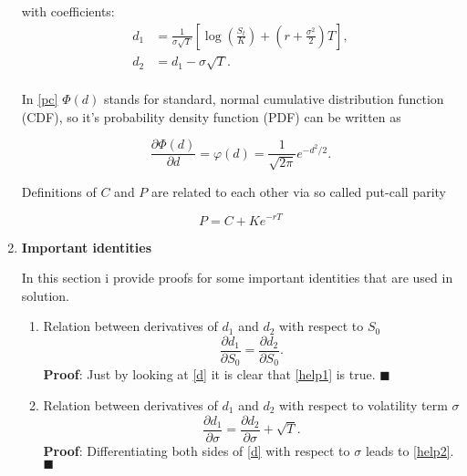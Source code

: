 \documentclass[12pt]{article}
\begin{document}
\begin{enumerate}[leftmargin=\labelsep]
with coefficients:
\begin{equation}
\begin{split}\label{d}
     d_1 &= \frac{1}{\sigma\sqrt{T}}\left[\log\left(\frac{S_t}{K}\right) + \left(r + \frac{\sigma^2}{2}\right)T\right], \\
     d_2 &= d_1 - \sigma\sqrt{T}. \\
\end{split}
\end{equation}

In \eqref{pc} $\Phi(d)$ stands for standard, normal cumulative distribution function (CDF), so it's probability density function (PDF) can be written as

\begin{equation}\label{pdf}
\frac{\partial \Phi(d)}{\partial d} = \varphi(d) = 
\frac{1}{\sqrt{2\pi}}  e^{-d^2/2}.
\end{equation}

Definitions of $C$ and $P$ are related to each other via so called put-call parity

\begin{equation}\label{pcparity}
    P = C + K e^{-rT}
\end{equation}

\item \textbf{Important identities}

In this section i provide proofs for some important identities that are used in solution.

\begin{enumerate}

    \item Relation between derivatives of $d_1$ and $d_2$ with respect to $S_0$
    \begin{equation}\label{help1}
        \frac{\partial d_1}{\partial S_0} = \frac{\partial d_2}{\partial S_0}.
    \end{equation}
    \textbf{Proof}: Just by looking at \eqref{d} it is clear that \eqref{help1} is true.  $\blacksquare$

     \item Relation between derivatives of $d_1$ and $d_2$ with respect to volatility term $\sigma$
    \begin{equation}\label{help2}
        \frac{\partial d_1}{\partial \sigma} = \frac{\partial d_2}{\partial \sigma} + \sqrt{T}.
    \end{equation}
    \textbf{Proof}: Differentiating both sides of \eqref{d} with respect to $\sigma$ leads to \eqref{help2}.  $\blacksquare$


\end{enumerate}
\end{enumerate}
\end{document}
